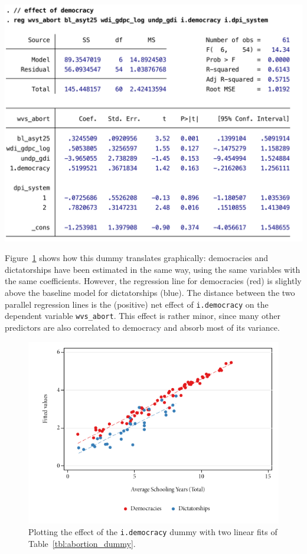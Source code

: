 	\begin{table}[htp]
		\includegraphics[scale=.5]{images/abortion_dummy.pdf}

	  	\caption[Linear regression with a dummy]{\label{tbl:abortion_dummy}%
        Linear regression with the \texttt{i.democracy} dummy, %
        recoded from variable \texttt{gol\_polreg}. %
		    \qog}
	\end{table}%
	
	Figure~\ref{fig:abortion_dummy_plot} shows how this dummy translates graphically: democracies and dictatorships have been estimated in the same way, using the same variables with the same coefficients. However, the regression line for democracies (red) is slightly above the baseline model for dictatorships (blue). The distance between the two parallel regression lines is the (positive) net effect of \texttt{i.democracy} on the dependent variable \texttt{wvs\_abort}. This effect is rather minor, since many other predictors are also correlated to democracy and absorb most of its variance.

	\begin{figure}[htp]
		\includegraphics[width=.9\textwidth]{images/abortion_dummy_plot.pdf}

		\caption[Plotting the effect of a dummy]{\label{fig:abortion_dummy_plot}%
		Plotting the effect of the \texttt{i.democracy} dummy with two linear fits of Table~\ref{tbl:abortion_dummy}. %
		\qog}
	\end{figure}%

